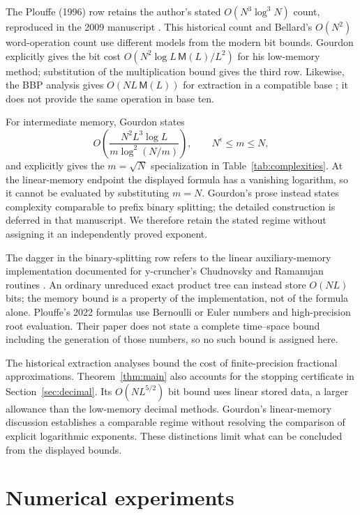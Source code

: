 \documentclass[11pt]{article}
\numberwithin{equation}{section}
\theoremstyle{definition}
\newcommand{\M}{\mathsf M}
\begin{document}
The Plouffe (1996) row retains the author's stated
$O(N^3\log^3N)$ count, reproduced in the 2009 manuscript
\cite{Plouffe09}. This historical count and Bellard's
$O(N^2)$ word-operation count use different models from the
modern bit bounds. Gourdon explicitly gives the bit cost
$O(N^2\log L\,\M(L)/L^2)$ for his low-memory method;
substitution of the multiplication bound gives the third row.
Likewise, the BBP analysis gives $O(NL\,\M(L))$ for extraction
in a compatible base \cite[Section~3]{BBP97}; it does not
provide the same operation in base ten.

For intermediate memory, Gourdon states
\[
 O\!\left(\frac{N^2L^3\log L}
 {m\log^2(N/m)}\right),\qquad N^\epsilon\le m\le N,
\]
and explicitly gives the $m=\sqrt N$ specialization in
Table~\ref{tab:complexities}. At the linear-memory endpoint
the displayed formula has a vanishing logarithm, so it
cannot be evaluated by substituting $m=N$. Gourdon's prose
instead states complexity comparable to prefix binary
splitting; the detailed construction is deferred in that
manuscript. We therefore retain the stated regime without
assigning it an independently proved exponent.

The dagger in the binary-splitting row refers to the linear
auxiliary-memory implementation documented for y-cruncher's
Chudnovsky and Ramanujan routines \cite{Yee}. An ordinary
unreduced exact product tree can instead store $O(NL)$ bits;
the memory bound is a property of the implementation, not
of the formula alone. Plouffe's 2022 formulas use Bernoulli
or Euler numbers and high-precision root evaluation.
Their paper does not state a complete time--space bound
including the generation of those numbers, so no such
bound is assigned here.

The historical extraction analyses bound the cost of
finite-precision fractional approximations. Theorem~\ref{thm:main}
also accounts for the stopping certificate in
Section~\ref{sec:decimal}. Its $O(NL^{5/2})$ bit bound uses
linear stored data, a larger allowance than the low-memory
decimal methods. Gourdon's linear-memory discussion establishes
a comparable regime without resolving the comparison of explicit
logarithmic exponents. These distinctions limit what can be
concluded from the displayed bounds.

\section{Numerical experiments}\label{sec:implementation}
\end{document}
